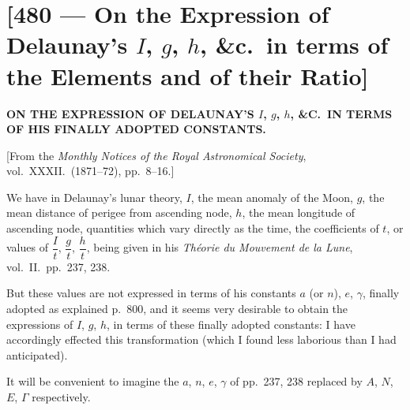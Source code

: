 \documentclass[11pt,a4paper]{article}
\theoremstyle{plain}
\theoremstyle{definition}
\theoremstyle{remark}
\begin{document}
\newpage
\section*{[480 --- On the Expression of Delaunay's $I$, $g$, $h$, \&c.\ in terms of the Elements and of their Ratio]}


\begin{center}
\textbf{ON THE EXPRESSION OF DELAUNAY'S $I$, $g$, $h$, \&C.\ IN TERMS OF HIS FINALLY ADOPTED CONSTANTS.}
\end{center}

[From the \textit{Monthly Notices of the Royal Astronomical Society}, vol.\ XXXII.\ (1871--72), pp.\ 8--16.]

\bigskip

We have in Delaunay's lunar theory, $I$, the mean anomaly of the Moon, $g$, the mean distance of perigee from ascending node, $h$, the mean longitude of ascending node, quantities which vary directly as the time, the coefficients of $t$, or values of $\dfrac{I}{t}$, $\dfrac{g}{t}$, $\dfrac{h}{t}$, being given in his \textit{Th\'eorie du Mouvement de la Lune}, vol.\ II.\ pp.\ 237, 238.

But these values are not expressed in terms of his constants $a$ (or $n$), $e$, $\gamma$, finally adopted as explained p.~800, and it seems very desirable to obtain the expressions of $I$, $g$, $h$, in terms of these finally adopted constants: I have accordingly effected this transformation (which I found less laborious than I had anticipated).

It will be convenient to imagine the $a$, $n$, $e$, $\gamma$ of pp.\ 237, 238 replaced by $A$, $N$, $E$, $\Gamma$ respectively.
\end{document}
